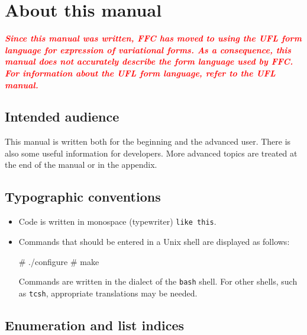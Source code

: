 
\chapter*{About this manual}

\textcolor{red}{\textbf{\textit{
    Since this manual was written, FFC has moved to using the UFL
    form language for expression of variational forms. As a consequence,
    this manual does not accurately describe the form language used by
    FFC. For information about the UFL form language, refer to the UFL
    manual.}}}

\section*{Intended audience}

This manual is written both for the beginning and the advanced user.
There is also some useful information for developers. More advanced topics
are treated at the end of the manual or in the appendix.

\section*{Typographic conventions}

\begin{itemize}
\item
  Code is written in monospace (typewriter) \texttt{like this}.
\item
  Commands that should be entered in a Unix shell
  are displayed as follows:
  \begin{code}
# ./configure
# make
  \end{code}
  Commands are written in the dialect of the \texttt{bash} shell. For
  other shells, such as \texttt{tcsh}, appropriate translations may be
  needed.
\end{itemize}

\section*{Enumeration and list indices}

